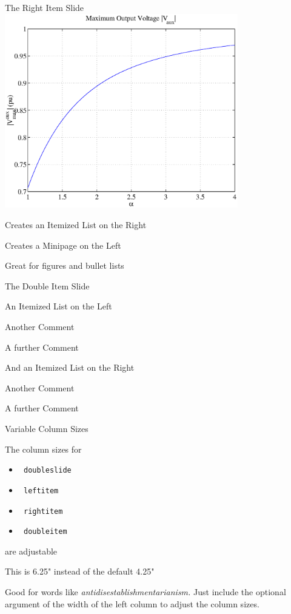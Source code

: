 \documentclass{uwmslide}
\begin{document}
\begin{rightitem}{The Right Item Slide}
\includegraphics[width=4in]{vaux.eps}
\slidedivider
\item Creates an Itemized List on the Right
\item Creates a Minipage on the Left
\item Great for figures and bullet lists
\end{rightitem}

\begin{doubleitem}{The Double Item Slide}
\item  An Itemized List on the Left
\item Another Comment
\item A further Comment
\slidedivider
\item And an Itemized List on the Right
\item Another Comment
\item A further Comment
\end{doubleitem}

\begin{leftitem}[6.25in]{Variable Column Sizes}
\item  The column sizes for 
\begin{itemize}
\item \verb+ doubleslide+
\item \verb+ leftitem+
\item \verb+ rightitem+
\item \verb+ doubleitem+
\end{itemize}
are adjustable
\item This is 6.25" instead of the default 4.25"
\item Good for words like {\em antidisestablishmentarianism.}
\slidedivider
 Just include the optional argument of
the width of the left column to adjust the
column sizes.
\end{leftitem}
\end{document}
